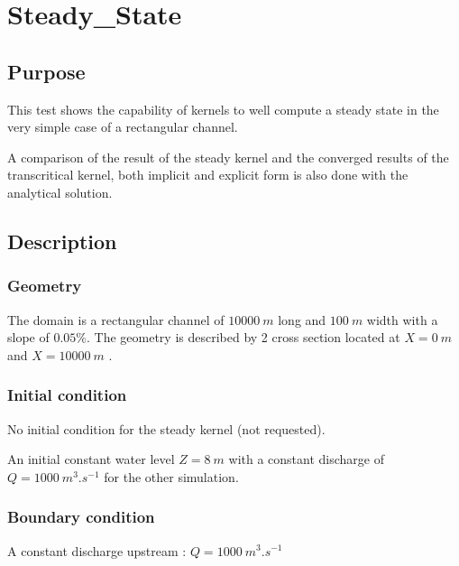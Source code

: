 \chapter{Steady\_State}
%


\section{Purpose}
This test shows the capability of \mascaret kernels to well compute a steady state in the very simple case of a rectangular channel.

A comparison of the result of the steady kernel and the converged results of the transcritical kernel, both implicit and explicit form is also done with the analytical solution.

\section{Description}

\subsection{Geometry}

The domain is a rectangular channel of $ 10000\ m $ long and $ 100\ m $ width with a slope of $ 0.05\% $.
The geometry is described by 2 cross section located at $ X = 0\ m $ and $ X = 10000\ m $ .

\subsection{Initial condition}

No initial condition for the steady kernel (not requested).

An initial constant water level $ Z = 8\ m $ with a constant discharge of $ Q = 1000\ m^{3}.s^{-1} $ for the other simulation.

\subsection{Boundary condition}

A constant discharge upstream : $ Q = 1000\ m^{3}.s^{-1} $

